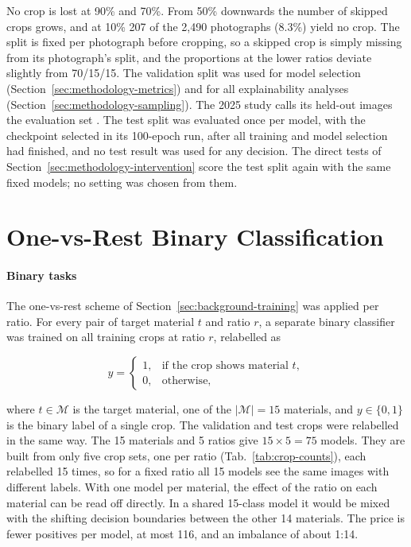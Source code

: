 No crop is lost at 90\% and 70\%. From 50\% downwards the number of skipped crops
grows, and at 10\% 207 of the 2,490 photographs (8.3\%) yield no crop. The split is
fixed per photograph before cropping, so a skipped crop is simply missing from its
photograph's split, and the proportions at the lower ratios deviate slightly from
70/15/15. The validation split was used for model selection (Section~\ref{sec:methodology-metrics}) and for all
explainability analyses (Section~\ref{sec:methodology-sampling}). The 2025 study calls its held-out images the
evaluation set \citep{schneidereitYOLOv8}. The test split was evaluated once per model,
with the checkpoint selected in its 100-epoch run, after all training and model selection had
finished, and no test result was used for any decision. The direct tests of
Section~\ref{sec:methodology-intervention} score the test split again with the same
fixed models; no setting was chosen from them.

\section{One-vs-Rest Binary Classification}
\label{sec:methodology-ovr}

\paragraph{Binary tasks}
The one-vs-rest scheme of Section~\ref{sec:background-training} was applied per ratio.
For every pair of target material $t$ and ratio $r$, a separate binary classifier was
trained on all training crops at ratio $r$, relabelled as

\begin{equation}
y = \begin{cases}
1, & \text{if the crop shows material } t,\\
0, & \text{otherwise,}
\end{cases}
\label{eq:ovr-label}
\end{equation}

where $t \in \mathcal{M}$ is the target material, one of the $|\mathcal{M}| = 15$
materials, and $y \in \{0, 1\}$ is the binary label of a single crop. The validation
and test crops were relabelled in the same way. The 15 materials and 5 ratios give
$15 \times 5 = 75$ models. They are built from only five crop sets, one per ratio
(Tab.~\ref{tab:crop-counts}), each relabelled 15 times, so for a fixed ratio all 15
models see the same images with different labels. With one model per material, the
effect of the ratio on each material can be read off directly. In a shared 15-class
model it would be mixed with the shifting decision boundaries between the other 14
materials. The price is fewer positives per model, at most 116, and an imbalance of
about 1:14.

